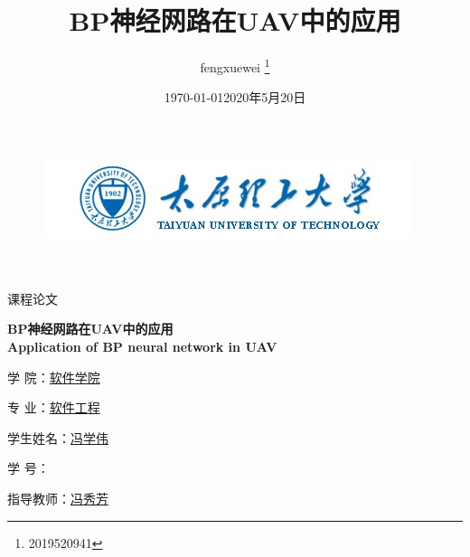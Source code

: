 \documentclass[UTF8,a4paper,10pt,nocolorlinks]{ctexart}
\title{\textbf{BP神经网路在UAV中的应用}}
\author{ fengxuewei \thanks{2019520941} }
\date{\today}
\DeclareRobustCommand{\sanhao}{\fontsize{16pt}{\baselineskip}\selectfont}  %
\begin{document}
   
    \begin{figure}[t]
		\parbox[b]{2cm}{
			\includegraphics[width=\textwidth]{TYUT.jpg}
			}
	\end{figure}

	\begin{center}
		\quad \\
		\quad \\
		\heiti \fontsize{45}{17} 课\quad 程\quad 论\quad 文
		\vskip 3.5cm	
        \begin{center}
            \huge{\textbf{BP神经网路在UAV中的应用}}\\[3mm]
            \Large{\textbf{Application of BP neural network in UAV}}\\[1mm]
        \end{center}
	\end{center}
	\vskip 3.5cm

        \begin{center}
            \songti \fontsize{15}{15}
            \doublespacing
            \par\setlength\parindent{12em}
            \quad
            \sanhao\par
            学\hspace{1cm}  院：\underline{\qquad 软件学院 \quad} 

            专\hspace{1cm}  业：\underline{\qquad 软件工程 \quad} 

            学生姓名：\underline{\qquad 冯学伟 \qquad }     

            学\hspace{1cm} 号：\underline{\quad}

            指导教师：\underline{\qquad 冯秀芳 \qquad}
            \vskip 2cm
            \centering
            \date{2020年5月20日}
        \end{center}
    
    \thispagestyle{empty} %
    \clearpage
\end{document}
